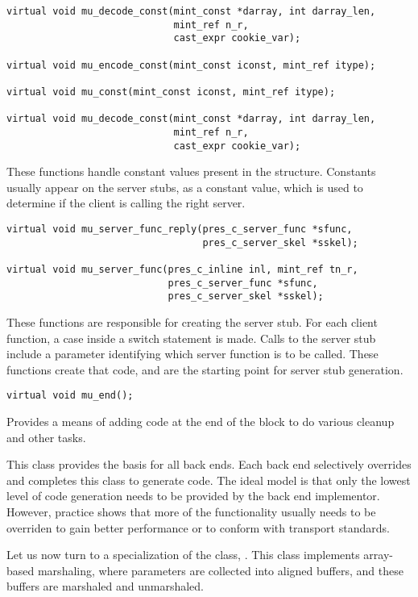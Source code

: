\begin{verbatim}
virtual void mu_decode_const(mint_const *darray, int darray_len,
                             mint_ref n_r,
                             cast_expr cookie_var);

virtual void mu_encode_const(mint_const iconst, mint_ref itype);

virtual void mu_const(mint_const iconst, mint_ref itype);

virtual void mu_decode_const(mint_const *darray, int darray_len,
                             mint_ref n_r,
                             cast_expr cookie_var);
\end{verbatim}

These functions handle constant values present in the \cpres{} structure.
Constants usually appear on the server stubs, as a constant value, which is
used to determine if the client is calling the right server.

\begin{verbatim}
virtual void mu_server_func_reply(pres_c_server_func *sfunc,
                                  pres_c_server_skel *sskel);

virtual void mu_server_func(pres_c_inline inl, mint_ref tn_r,
                            pres_c_server_func *sfunc,
                            pres_c_server_skel *sskel);
\end{verbatim}

These functions are responsible for creating the server stub.  For each client
function, a case inside a switch statement is made.  Calls to the server stub
include a parameter identifying which server function is to be called.  These
functions create that code, and are the starting point for server stub
generation.

\noindent\verb|virtual void mu_end();|

Provides a means of adding code at the end of the block to do various cleanup
and other tasks.

This class provides the basis for all back ends.  Each back end selectively
overrides and completes this class to generate code.  The ideal model is that
only the lowest level of code generation needs to be provided by the back end
implementor.  However, practice shows that more of the functionality usually
needs to be overriden to gain better performance or to conform with transport
standards.

Let us now turn to a specialization of the \mus{} class, \mmus{}.  This class
implements array-based marshaling, where parameters are collected into aligned
buffers, and these buffers are marshaled and unmarshaled.

